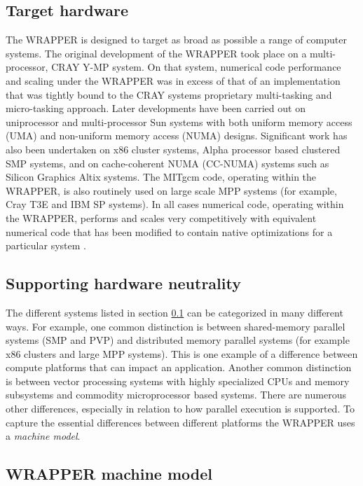 \subsection{Target hardware}
\label{sec:target_hardware}

The WRAPPER is designed to target as broad as possible a range of
computer systems.  The original development of the WRAPPER took place
on a multi-processor, CRAY Y-MP system. On that system, numerical code
performance and scaling under the WRAPPER was in excess of that of an
implementation that was tightly bound to the CRAY systems proprietary
multi-tasking and micro-tasking approach. Later developments have been
carried out on uniprocessor and multi-processor Sun systems with both
uniform memory access (UMA) and non-uniform memory access (NUMA)
designs.  Significant work has also been undertaken on x86 cluster
systems, Alpha processor based clustered SMP systems, and on
cache-coherent NUMA (CC-NUMA) systems such as Silicon Graphics Altix
systems.  The MITgcm code, operating within the WRAPPER, is also
routinely used on large scale MPP systems (for example, Cray T3E and
IBM SP systems). In all cases numerical code, operating within the
WRAPPER, performs and scales very competitively with equivalent
numerical code that has been modified to contain native optimizations
for a particular system \cite{hoe-hill:99}.

\subsection{Supporting hardware neutrality}

The different systems listed in section \ref{sec:target_hardware} can
be categorized in many different ways. For example, one common
distinction is between shared-memory parallel systems (SMP and PVP)
and distributed memory parallel systems (for example x86 clusters and
large MPP systems). This is one example of a difference between
compute platforms that can impact an application. Another common
distinction is between vector processing systems with highly
specialized CPUs and memory subsystems and commodity microprocessor
based systems. There are numerous other differences, especially in
relation to how parallel execution is supported. To capture the
essential differences between different platforms the WRAPPER uses a
{\it machine model}.

\subsection{WRAPPER machine model}

